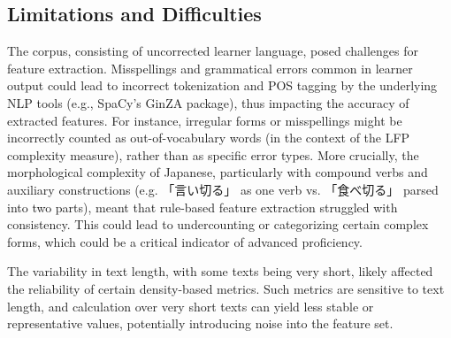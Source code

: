 \subsection{Limitations and Difficulties}


The corpus, consisting of uncorrected learner language, posed challenges for feature extraction. Misspellings and
grammatical errors common in learner output could lead to incorrect tokenization and POS tagging by the underlying
NLP tools (e.g., SpaCy's GinZA package), thus impacting the accuracy of extracted features. For instance, irregular
forms or misspellings might be incorrectly counted as out-of-vocabulary words (in the context of the LFP complexity
measure), rather than as specific error types. More crucially, the morphological complexity of Japanese,
particularly with compound verbs and auxiliary constructions (e.g. 「言い切る」 as one verb vs. 「食べ切る」 parsed into two
parts), meant that rule-based feature extraction struggled with consistency. This could lead to undercounting or
categorizing certain complex forms, which could be a critical indicator of advanced proficiency.

The variability in text length, with some texts being very short, likely affected the reliability of certain
density-based metrics. Such metrics are sensitive to text
length, and calculation over very short texts can yield less stable or representative values, potentially
introducing noise into the feature set.

